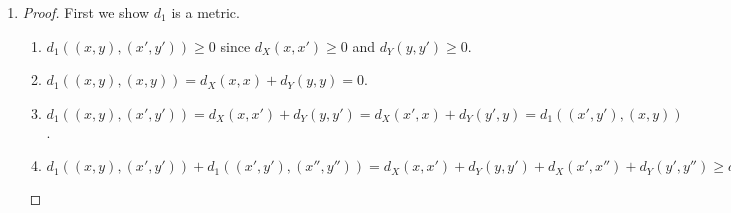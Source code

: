 \documentclass[11pt, letterpaper]{article}
\begin{document}
\begin{enumerate}
\begin{enumerate}
    To show that $(f_n)$ diverges in $(C[0, 1], d)$, we first show that $(f_n)$ converges to the step function 
    $$
      g(x) = \begin{cases}0, & 0 \leq x < 1/2 \\ 1, & 1/2 \leq x \leq 1\end{cases}
    $$ 
    in $(\mathbb R^{[0, 1]}, d)$, where $\mathbb R^{[0, 1]}$ is the set of functions from $[0, 1] \to \mathbb R$.
    \begin{proof}
      Let $\epsilon > 0$. Choose $N \in \mathbb N$ such that $\frac{1}{2N} < \epsilon$. Since $g(x) \geq f_n(x)$ for all $n \in \mathbb N$, 
      $
        d(f_n, g) = \int_0^1 g(x) dx - \int_0^1 f_n(x) dx.
        = \frac{1}{2} - \frac{n - 1}{2n}
        = \frac{1}{2n}
        \leq \frac{1}{2N}
        < \epsilon
      $.
    \end{proof}
    Since $g \not\in C[0, 1]$ (the step function is discontinuous at $x = 1/2$), by uniqueness of convergence, $(f_n)$ does not converge in $(C[0, 1], d)$.
    \item \begin{proof}
      Choose $\epsilon = 1/2$. Let $N \in \mathbb N$. Choose $m, n \in \mathbb N$ such that $m = 2n > n > N$. Then, for $x \in \left(\frac{1}{2}, \frac{1}{2} + \frac{1}{m} \right]$,
      \begin{align*}
        \vert f_m(x) - f_n(x) \vert 
        &= mx - \frac{m}{2} - \left(nx - \frac{n}{2}\right) \\
        &= 2nx - n - nx + \frac{n}{2} \\
        &= nx - \frac{n}{2}
      \end{align*}
      so $\left\vert f_m\left(\frac{1}{2} + \frac{1}{m}\right) - f_n\left(\frac{1}{2} + \frac{1}{m}\right) \right\vert = \left\vert f_m\left(\frac{1}{2} + \frac{1}{2n}\right) - f_n\left(\frac{1}{2} + \frac{1}{2n}\right) \right\vert = \frac{1}{2}$. Thus, $\sup_{x \in [0, 1]} \vert f_m(x) - f_n(x) \vert \geq \frac{1}{2} = \epsilon$. So $(f_n)$ is not Cauchy.
    \end{proof}
    \newpage
  \end{enumerate}
  \item \begin{proof} First we show $d_1$ is a metric.
  \begin{enumerate}
    \item $d_1((x, y), (x', y')) \geq 0$ since $d_X(x, x') \geq 0$ and $d_Y(y, y') \geq 0$.
    \item $d_1((x, y), (x, y)) = d_X(x, x) + d_Y(y, y) = 0$.
    \item $d_1((x, y), (x', y')) = d_X(x, x') + d_Y(y, y') = d_X(x', x) + d_Y(y', y) = d_1((x', y'), (x, y))$.
    \item $d_1((x, y), (x', y')) + d_1((x', y'), (x'', y'')) = d_X(x, x') + d_Y(y, y') + d_X(x', x'') + d_Y(y', y'') \geq d_X(x, x'') + d_Y(y, y'') = d_1((x, y), (x'', y''))$
  \end{enumerate}


\end{proof}
\end{enumerate}
\end{document}
